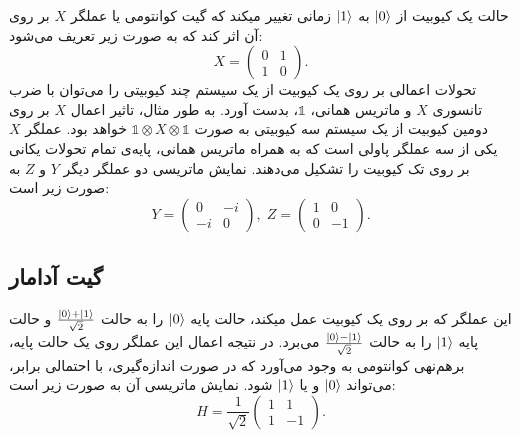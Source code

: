 \documentclass[a4paper,11pt,oneside,openany]{iut-thesis}
\begin{document}
 حالت یک کیوبیت از $ \ket 0 $ به $ \ket 1 $ زمانی تغییر میکند که گیت کوانتومی یا عملگر $ X $ بر روی آن اثر کند که به صورت زیر تعریف می‌شود:
\begin{equation}
X = \begin{pmatrix} 0 & 1 \\ 1 & 0 \end{pmatrix} .
\end{equation}
تحولات اعمالی بر روی یک کیوبیت از یک سیستم چند کیوبیتی را می‌توان با ضرب تانسوری $ X $  و ماتریس همانی، $ \mathbb{1} $، بدست آورد. به طور مثال،‌ تاثیر اعمال $ X $  بر روی دومین کیوبیت از یک سیستم سه کیوبیتی به صورت $ \mathbb{1} \otimes X \otimes \mathbb{1} $  خواهد بود.
عملگر $X$ یکی از سه عملگر پاولی است که به همراه ماتریس همانی، پایه‌ی تمام تحولات یکانی بر روی تک کیوبیت را تشکیل می‌دهند. نمایش ماتریسی دو عملگر دیگر $Y$ و $Z$ به صورت زیر است:
\begin{equation}
Y = \begin{pmatrix} 0 & -i \\ -i & 0 \end{pmatrix}, \;
Z = \begin{pmatrix} 1 & 0 \\ 0 & -1 \end{pmatrix}.
\end{equation}
\subsection{
گیت آدامار
}
این عملگر که بر روی یک کیوبیت عمل میکند، حالت پایه $ \ket 0 $ را به حالت  $ \frac{\ket 0 + \ket 1 }{\sqrt{2}} $ و حالت پایه $ \ket 1 $ را به حالت $ \frac{\ket 0 - \ket 1 }{\sqrt{2}} $ می‌برد. در نتیجه اعمال این عملگر روی یک حالت پایه، برهم‌نهی کوانتومی به وجود می‌آورد که در صورت اندازه‌گیری، با احتمالی برابر، می‌تواند $\ket 0 $ و یا $ \ket 1 $ شود. نمایش ماتریسی آن به صورت زیر است:
\begin{equation}
H = \frac{1}{\sqrt{2}} \begin{pmatrix} 1 & 1 \\ 1 & -1 \end{pmatrix}.
\end{equation}
\end{document}
